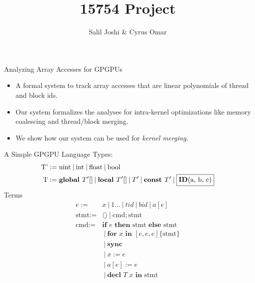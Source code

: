 \documentclass{beamer}
\title{15754 Project}
\author{Salil Joshi \& Cyrus Omar}
\newcommand{\nil}{\langle\rangle}
\newcommand{\Global}{\textbf{global }}
\newcommand{\local}{\textbf{local }}
\newcommand{\const}{\textbf{const }}
\newcommand{\id}[3]{\textbf{ID}(#1, #2, #3)}
\newcommand{\Ifte}[3]{\textbf{if } #1 \textbf{ then } #2 \textbf{ else } #3}
\newcommand{\for}[5]{\textbf{for } #1 \textbf{ in } [#2, #3, #4] \{#5\}}
\newcommand{\sync}{\textbf{sync}}
\newcommand{\decl}[3]{\textbf{decl } #1\; #2 \textbf{ in } #3}
\renewcommand{\|}{\:|\:}
\begin{document}
\begin{frame}{Analyzing Array Accesses for GPGPUs}
\begin{itemize}
  \item A formal system to track array accesses that are linear polynomials of thread and block ids.
  \item Our system formalizes the analyses for intra-kernel optimizations like memory coalescing and thread/block merging.
  \item We show how our system can be used for \emph{kernel merging}.
\end{itemize}
\end{frame}


\begin{frame}{A Simple GPGPU Language}
Types:
  \begin{align*}
    \text{T'} &:=  \text{uint} \| \text{int} \| \text{float} \| \text{bool} \\
    \text{T} &:= \Global T' [] \| \local T' [] \| T' \| \const T' \| \fbox{\id{a}{b}{c}} \\
  \end{align*}
Terms
  \begin{align*}
    e := & x \| 1\ldots \| tid \| bid \| a[e] \\
    \text{stmt} := & \nil \| \text{cmd}; \text{stmt}\\
    \text{cmd} := & \Ifte{e}{\text{stmt}}{\text{stmt}} \\
                  & \| \for{x}{e}{e}{e}{\text{stmt}} \\
                  & \| \sync \\
                  & \| x := e \\
                  & \| a[e] := e \\
                  & \| \decl{T}{x}{\text{stmt}}
  \end{align*}
\end{frame}
\end{document}
